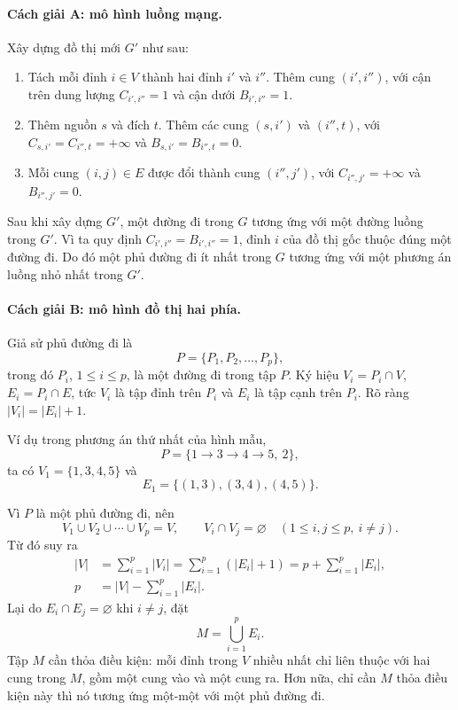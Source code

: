 \documentclass[11pt]{article}
\begin{document}
\paragraph{Cách giải A: mô hình luồng mạng.}
Xây dựng đồ thị mới \(G'\) như sau:
\begin{enumerate}
  \item Tách mỗi đỉnh \(i\in V\) thành hai đỉnh \(i'\) và \(i''\). Thêm cung
  \((i',i'')\), với cận trên dung lượng \(C_{i',i''}=1\) và cận dưới
  \(B_{i',i''}=1\).
  \item Thêm nguồn \(s\) và đích \(t\). Thêm các cung \((s,i')\) và
  \((i'',t)\), với \(C_{s,i'}=C_{i'',t}=+\infty\) và
  \(B_{s,i'}=B_{i'',t}=0\).
  \item Mỗi cung \((i,j)\in E\) được đổi thành cung \((i'',j')\), với
  \(C_{i'',j'}=+\infty\) và \(B_{i'',j'}=0\).
\end{enumerate}
Sau khi xây dựng \(G'\), một đường đi trong \(G\) tương ứng với một đường
luồng trong \(G'\). Vì ta quy định \(C_{i',i''}=B_{i',i''}=1\), đỉnh \(i\)
của đồ thị gốc thuộc đúng một đường đi. Do đó một phủ đường đi ít nhất trong
\(G\) tương ứng với một phương án luồng nhỏ nhất trong \(G'\).

\paragraph{Cách giải B: mô hình đồ thị hai phía.}
Giả sử phủ đường đi là
\[
  P=\{P_1,P_2,\ldots,P_p\},
\]
trong đó \(P_i\), \(1\le i\le p\), là một đường đi trong tập \(P\). Ký hiệu
\(V_i=P_i\cap V\), \(E_i=P_i\cap E\), tức \(V_i\) là tập đỉnh trên \(P_i\) và
\(E_i\) là tập cạnh trên \(P_i\). Rõ ràng \(|V_i|=|E_i|+1\).

Ví dụ trong phương án thứ nhất của hình mẫu,
\[
  P=\{1\to3\to4\to5,\ 2\},
\]
ta có \(V_1=\{1,3,4,5\}\) và
\[
  E_1=\{(1,3),(3,4),(4,5)\}.
\]

Vì \(P\) là một phủ đường đi, nên
\[
  V_1\cup V_2\cup\cdots\cup V_p=V,
  \qquad
  V_i\cap V_j=\varnothing\quad(1\le i,j\le p,\ i\ne j).
\]
Từ đó suy ra
\[
\begin{aligned}
  |V|
  &=\sum_{i=1}^p |V_i|
   =\sum_{i=1}^p (|E_i|+1)
   =p+\sum_{i=1}^p |E_i|,\\
  p&=|V|-\sum_{i=1}^p |E_i|.
\end{aligned}
\]
Lại do \(E_i\cap E_j=\varnothing\) khi \(i\ne j\), đặt
\[
  M=\bigcup_{i=1}^p E_i.
\]
Tập \(M\) cần thỏa điều kiện: mỗi đỉnh trong \(V\) nhiều nhất chỉ liên thuộc
với hai cung trong \(M\), gồm một cung vào và một cung ra. Hơn nữa, chỉ cần
\(M\) thỏa điều kiện này thì nó tương ứng một-một với một phủ đường đi.
\end{document}
